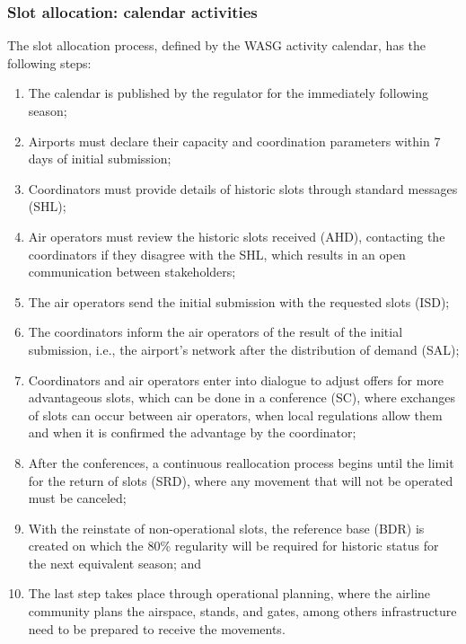 %

\subsubsection{Slot allocation: calendar activities}

The slot allocation process, defined by the \acrshort{WASG} activity calendar, has the following steps: 

\begin{enumerate}
    \item The calendar is published by the regulator for the immediately following season;
    \item Airports must declare their capacity and coordination parameters within 7 days of initial submission;
    \item Coordinators must provide details of historic slots through standard messages (\acrshort{SHL});
    \item Air operators must review the historic slots received (\acrshort{AHD}), contacting the coordinators if they disagree with the SHL, which results in an open communication between stakeholders;
    \item The air operators send the initial submission with the requested slots (\acrshort{ISD});
    \item The coordinators inform the air operators of the result of the initial submission, i.e., the airport's network after the distribution of demand (\acrshort{SAL});
    \item Coordinators and air operators enter into dialogue to adjust offers for more advantageous slots, which can be done in a conference (\acrshort{SC}), where exchanges of slots can occur between air operators, when local regulations allow them and when it is confirmed the advantage by the coordinator;
    \item After the conferences, a continuous reallocation process begins until the limit for the return of slots (\acrshort{SRD}), where any movement that will not be operated must be canceled;
    \item With the reinstate of non-operational slots, the reference base (\acrshort{BDR}) is created on which the 80\% regularity will be required for historic status for the next equivalent season; and
    \item The last step takes place through operational planning, where the airline community plans the airspace, stands, and gates, among others infrastructure need to be prepared to receive the movements.
\end{enumerate}

